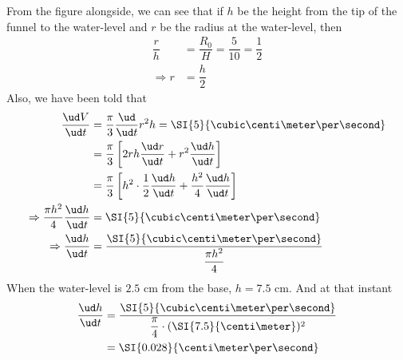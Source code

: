 \begin{solution}[\halfpage]
	From the figure alongside, we can see that if 
	$h$ be the height from the tip of the funnel to the water-level and $r$
	be the radius at the water-level, then 
	\begin{align}
		\dfrac{r}{h} &= \dfrac{R_0}{H} = \dfrac{5}{10} = \dfrac{1}{2} \\
		\Rightarrow r &= \dfrac{h}{2}
	\end{align}
	Also, we have been told that 
	\begin{align}
		\dfrac{\ud V}{\ud t} &= \dfrac{\pi}{3}\dfrac{\ud}{\ud t}r^2h = \SI{5}{\cubic\centi\meter\per\second} \\
		&= \dfrac{\pi}{3}\left[2rh\dfrac{\ud r}{\ud t} + r^2\dfrac{\ud h}{\ud t}\right] \\
		&= \dfrac{\pi}{3}\left[h^2\cdot\dfrac{1}{2}\dfrac{\ud h}{\ud t} + \dfrac{h^2}{4}\dfrac{\ud h}{\ud t} \right] \\
		\Rightarrow \dfrac{\pi h^2}{4}\dfrac{\ud h}{\ud t} &= \SI{5}{\cubic\centi\meter\per\second} \\
		\Rightarrow \dfrac{\ud h}{\ud t} &= \dfrac{\SI{5}{\cubic\centi\meter\per\second}}
		{\dfrac{\pi h^2}{4}}
	\end{align}
	When the water-level is $2.5$ cm from the base, $h = 7.5$ cm. And at that instant
	\begin{align}
		\dfrac{\ud h}{\ud t} &= \dfrac{\SI{5}{\cubic\centi\meter\per\second}}
		{\dfrac{\pi}{4}\cdot(\SI{7.5}{\centi\meter})^2} \\
		&= \SI{0.028}{\centi\meter\per\second}
	\end{align}
\end{solution}
